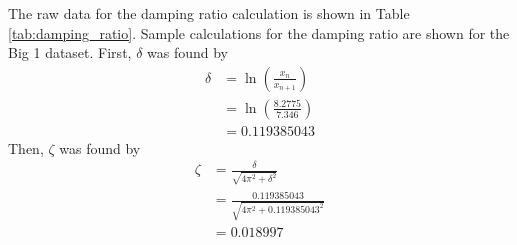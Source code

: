 The raw data for the damping ratio calculation is shown in Table \ref{tab:damping_ratio}. Sample calculations for the damping ratio are shown for the Big 1 dataset. First, $\delta$ was found by
\begin{align*}
    \delta &= \ln\left(\frac{x_n}{x_{n+1}}\right) \\
    &= \ln\left(\frac{8.2775}{7.346}\right) \\
    &= 0.119385043
\end{align*}
Then, $\zeta$ was found by
\begin{align*}
    \zeta &= \frac{\delta}{\sqrt{4\pi^2 + \delta^2}} \\
    &= \frac{0.119385043}{\sqrt{4\pi^2 + 0.119385043^2}} \\
    &= \boxed{0.018997}
\end{align*}